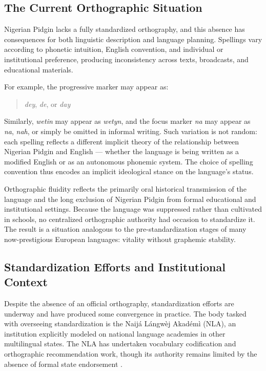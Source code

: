 \documentclass[12pt]{article}
\begin{document}
\subsection{The Current Orthographic Situation}

Nigerian Pidgin lacks a fully standardized orthography, and this absence has consequences for both linguistic description and language planning. Spellings vary according to phonetic intuition, English convention, and individual or institutional preference, producing inconsistency across texts, broadcasts, and educational materials.

For example, the progressive marker may appear as:

\begin{quote}
\textit{dey}, \textit{de}, or \textit{day}
\end{quote}

Similarly, \textit{wetin} may appear as \textit{wetyn}, and the focus marker \textit{na} may appear as \textit{na}, \textit{nah}, or simply be omitted in informal writing. Such variation is not random: each spelling reflects a different implicit theory of the relationship between Nigerian Pidgin and English --- whether the language is being written as a modified English or as an autonomous phonemic system. The choice of spelling convention thus encodes an implicit ideological stance on the language's status.

Orthographic fluidity reflects the primarily oral historical transmission of the language and the long exclusion of Nigerian Pidgin from formal educational and institutional settings. Because the language was suppressed rather than cultivated in schools, no centralized orthographic authority had occasion to standardize it. The result is a situation analogous to the pre-standardization stages of many now-prestigious European languages: vitality without graphemic stability.

\subsection{Standardization Efforts and Institutional Context}

Despite the absence of an official orthography, standardization efforts are underway and have produced some convergence in practice. The body tasked with overseeing standardization is the Naijá Lángwèj Akadémì (NLA), an institution explicitly modeled on national language academies in other multilingual states. The NLA has undertaken vocabulary codification and orthographic recommendation work, though its authority remains limited by the absence of formal state endorsement \cite{Ehondor2020}.
\end{document}

